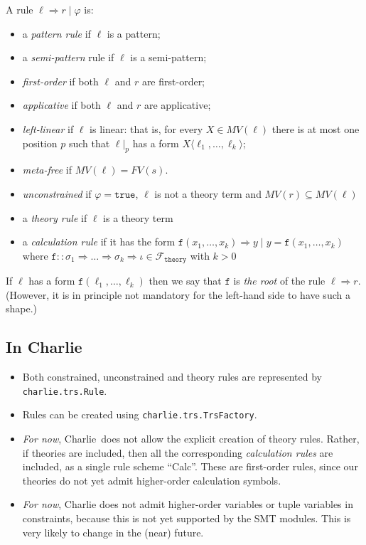 \documentclass{lmcs}
\theoremstyle{theorem}\newtheorem{theorem}{Theorem}
\theoremstyle{theorem}\newtheorem{lemma}[theorem]{Lemma}
\theoremstyle{theorem}\newtheorem{corollary}[theorem]{Corollary}
\theoremstyle{definition}\newtheorem{definition}[theorem]{Definition}
\theoremstyle{definition}\newtheorem{example}[theorem]{Example}
\newcommand{\thF}{\mathcal{F}_{\mathtt{theory}}}
\newcommand{\FV}{\mathit{FV}}
\newcommand{\FMV}{\mathit{MV}}
\newcommand{\asort}{\iota}
\newcommand{\atype}{\sigma}
\newcommand{\identifier}[1]{\mathtt{#1}}
\newcommand{\afun}{\identifier{f}}
\newcommand{\avar}{x}
\newcommand{\bvar}{y}
\newcommand{\Avar}{X}
\newcommand{\meta}[2]{#1\langle#2\rangle}
\newcommand{\arrtype}{\Rightarrow}
\newcommand{\arrz}{\Rightarrow}
\newcommand{\symb}[1]{\mathtt{#1}}
\newcommand{\strue}{\symb{true}}
\newcommand{\charlie}{\textsf{Charlie}\xspace}
\begin{document}
A rule $\ell \arrz r \mid \varphi$ is:
\begin{itemize}
\item a \emph{pattern rule} if $\ell$ is a pattern;
\item a \emph{semi-pattern} rule if $\ell$ is a semi-pattern;
\item \emph{first-order} if both $\ell$ and $r$ are first-order;
\item \emph{applicative} if both $\ell$ and $r$ are applicative;
\item \emph{left-linear} if $\ell$ is linear: that is, for every $\Avar \in
  \FMV(\ell)$ there is at most one position $p$ such that $\ell|_p$ has a form
  $\meta{\Avar}{\ell_1,\dots,\ell_k}$;
\item \emph{meta-free} if $\FMV(\ell) = \FV(s)$.
\item \emph{unconstrained} if $\varphi = \strue$, $\ell$ is not a theory term
  and $\FMV(r) \subseteq \FMV(\ell)$
\item a \emph{theory rule} if $\ell$ is a theory term
\item a \emph{calculation rule} if it has the form
  $\afun(\avar_1,\dots,\avar_k) \arrz \bvar \mid \bvar = \afun(\avar_1,\dots,
  \avar_k)$ where $\afun :: \atype_1 \arrtype \dots \arrtype \atype_k \arrtype
  \asort \in \thF$ with $k > 0$
\end{itemize}
If $\ell$ has a form $\afun(\ell_1,\dots,\ell_k)$ then we say that $\afun$ is
\emph{the root} of the rule $\ell \arrz r$.  (However, it is in principle not
mandatory for the left-hand side to have such a shape.)

\subsection*{In \charlie}

\begin{itemize}
\item Both constrained, unconstrained and theory rules are represented by
  \texttt{charlie.trs.Rule}.
\item Rules can be created using \texttt{charlie.trs.TrsFactory}.
\item \emph{For now}, \charlie\ does not allow the explicit creation of theory
  rules.  Rather, if theories are included, then all the corresponding
  \emph{calculation rules} are included, as a single rule scheme
  ``Calc''.  These are first-order rules, since our theories do not yet admit
  higher-order calculation symbols.
\item \emph{For now}, \charlie does not admit higher-order variables or tuple
  variables in constraints, because this is not yet supported by the SMT
  modules.  This is very likely to change in the (near) future.
\end{itemize}
\end{document}
